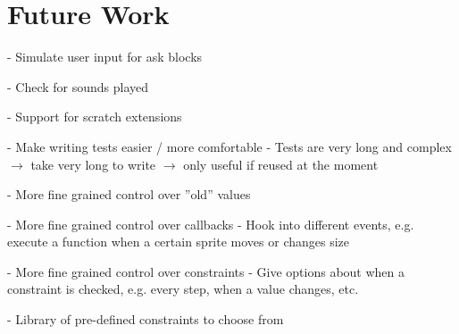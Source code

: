 \chapter{Future Work}

- Simulate user input for ask blocks

- Check for sounds played

- Support for scratch extensions

- Make writing tests easier / more comfortable
    - Tests are very long and complex
    $\rightarrow$ take very long to write $\rightarrow$ only useful if reused at the moment

- More fine grained control over ''old'' values

- More fine grained control over callbacks
    - Hook into different events, e.g. execute a function when a certain sprite moves or changes size

- More fine grained control over constraints
    - Give options about when a constraint is checked, e.g. every step, when a value changes, etc.

- Library of pre-defined constraints to choose from
